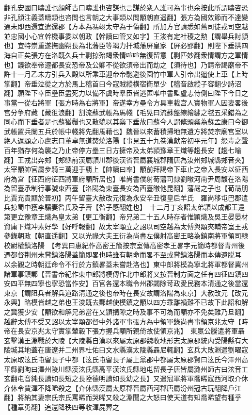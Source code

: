 翻孔安國曰疇誰也顔師古曰疇誰也咨謀也言謀於衆人誰可為事也余按此所謂疇咨恐非孔顔注義蓋疇類也咨問也言朝之大事類以問顒朝直遥翻】張方為國效節而不達變通未即西還宜遣還郡【方本為馮翊太守為于偽翻】所加方官請悉如舊司徒戎司空越並忠國小心宜幹機事委以朝政【幹讀曰管又如字】王浚有定社稷之勲【謂舉兵討頴也】宜特崇重遂撫幽朔長為北藩臣等竭力扞城藩屏皇家【屛必郢翻】則陛下垂拱四海自正矣張方在洛既久兵士剽掠殆竭衆情喧喧無復留意【剽匹妙翻衆情謂方之軍情也】議欲奉帝遷都長安恐帝及公卿不從欲須帝出而劫之【須待也】乃請帝謁廟帝不許十一月乙未方引兵入殿以所乘車迎帝帝馳避後園竹中軍人引帝出逼使上車【上時掌翻】帝垂泣從之方於馬上稽首曰今寇賊縱横宿衛單少【稽音啟縱子容翻少詩沼翻】願陛下幸臣壘臣盡死力以備不虞時羣臣皆逃匿唯中書監盧志侍側曰陛下今日之事當一從右將軍【張方時為右將軍】帝遂幸方壘令方具車載宫人寶物軍人因妻畧後宫分争府藏【藏徂浪翻】割流蘇武帳為馬帴【毛晃曰流蘇盤線繪繡之毬五采錯為之同心而下垂者是也蘇猶鬚也又散貌以其橤下垂故曰蘇今人謂絛頭橤為蘇孟康曰今御武帳置兵闌五兵於帳中帴將先翻馬藉也】魏晉以來蓄積掃地無遺方將焚宗廟宫室以絶人返顧之心盧志曰董卓無道焚燒洛陽【事見五十九卷漢獻帝初平元年】怨毒之聲百年猶存何為襲之乃止帝停方壘三日方擁帝及太弟頴豫章王熾等趨長安【趨七喻翻】王戎出奔郟【郟縣前漢屬頴川郡後漢省晉屬襄城郡隋唐為汝州郟城縣郟音夾】太宰顒帥官屬步騎三萬迎于覇上【帥讀曰率】顒前拜謁帝下車止之帝入長安以征西府為宫【征西府征西將軍府顒所居也】唯尚書僕射荀藩司隸劉暾河南尹周馥在洛陽為留臺承制行事號東西臺【洛陽為東臺長安為西臺暾他昆翻】藩勗之子也【荀勗朋比賈充貴顯於晉初】丙午留臺大赦改元復為永安辛丑復皇后羊氏　羅尚移屯巴郡遣兵掠蜀中獲李驤妻昝氏及子壽【昝子感翻姓也】　十二月丁亥詔太弟頴以成都王還第更立豫章王熾為皇太弟【更工衡翻】帝兄弟二十五人時存者惟頴熾及吳王晏晏材資庸下熾冲素好學【好呼報翻】故太宰顒立之詔以司空越為太傅與顒夾輔帝室王戎參錄朝政【朝直遥翻】又以光祿大夫王衍為尚書左僕射高密王略為鎮南將軍領司隸校尉權鎮洛陽　【考異曰惠紀作高密王簡按宗室傳高密孝王畧字元簡時都督青州後遷都督荆州未嘗鎮洛陽蓋簡即畧也時雖有朝命而畧不至或嘗鎮洛陽而本傳遺脱耳　以余觀之時朝廷命令不行於方鎮畧蓋未嘗赴洛也】東中郎將模為寧北將軍都督冀州諸軍事鎮鄴【晉書帝紀作東中郎將模傳作北中郎將又按晉制方面之任有四征四鎮四安四平無四寧也寧恐當作安】百官各還本職令州郡蠲除苛政愛民務本清通之後當還東京【謂阻兵者解兵道路清通之後也帝時在長安故謂洛陽為東京】大赦改元【改元永興】略模皆越之弟也王浚既去鄴越使模鎮之顒以四方乖離禍難不已故下此詔和解之冀獲少安【顒欲和解兄弟當在乂頴搆隙之時及事不可為而顒亦不免矣難乃旦翻】越辭太傅不受又詔以太宰顒都督中外諸軍事張方為中領軍錄尚書事領京兆太守【時帝在長安京兆太守實掌輦轂下張方握兵顒所親倚故使領京兆】　東嬴公騰遣將軍聶玄擊漢王淵戰於大陵【大陵縣自漢以來屬太原郡魏收地形志太原郡統内受陽縣有大陵城其地蓋在唐遼并二州界杜佑曰文水縣漢太陵縣聶尼輒翻】玄兵大敗淵遣劉曜寇太原取泫氏屯留長子中都【泫氏屯留長子屬上黨郡中都屬太原郡賢曰泫氏今澤州高平縣劉昫曰澤州陵川縣漢泫氏縣高平漢泫氏縣地屯留長子唐皆屬潞州師古曰泫音工玄翻屯音純長讀如長短之長陸德明讀如長幼之長】又遣冠軍將軍喬晞寇西河取介休介休令賈渾不降晞殺之【介休縣漢屬太原郡晉屬西河郡唐屬汾州冠古玩翻降戶江翻】將納其妻宗氏宗氏罵晞而哭晞又殺之淵聞之大怒曰使天道有知喬晞望有種乎【種章勇翻】追還降秩四等收渾屍葬之

